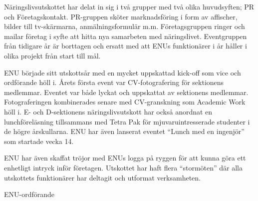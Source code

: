 \documentclass[../_main/handlingar.tex]{subfiles}
\begin{document}

Näringslivsutskottet har delat in sig i två grupper med två olika huvudsyften; PR och Företagskontakt. PR-gruppen sköter marknadsföring i form av affischer, bilder till tv-skärmarna, anmälningsformulär m.m. Företagsgruppen ringer och mailar företag i syfte att hitta nya samarbeten med näringslivet. Eventgruppen från tidigare år är borttagen och ersatt med att ENUs funktionärer i år håller i olika projekt från start till mål.

ENU började sitt utskottsår med en mycket uppskattad kick-off som vice och ordförande höll i. Årets första event var CV-fotografering för sektionens medlemmar. Eventet var både lyckat och uppskattat av sektionens medlemmar. Fotograferingen kombinerades senare med CV-granskning som Academic Work höll i. E- och D-sektionens näringslivsutskott har också anordnat en lunchföreläsning tillsammans med Tetra Pak för mjuvaruintresserade studenter i de högre årskullarna. ENU har även lanserat eventet ``Lunch med en ingenjör'' som startade vecka 14.

ENU har även skaffat tröjor med ENUs logga på ryggen för att kunna göra ett enhetligt intryck inför företagen. Utskottet har haft flera ``stormöten'' där alla utskottets funktionärer har deltagit och utformat verksamheten.

\begin{signatures}{1}
    \mvh
    \signature{Johannes Koch}{ENU-ordförande}
\end{signatures}
\end{document}
